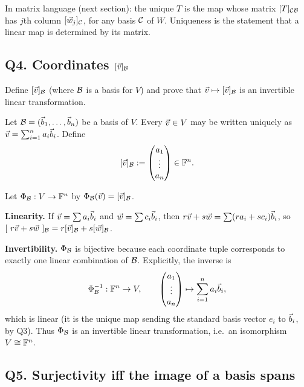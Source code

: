 \begin{laterbox}
In matrix language (next section): the unique $T$ is the map whose matrix
$[T]_{\mathcal{C}\mathcal{B}}$ has $j$th column $[\vec{w}_j]_{\mathcal{C}}$, for any basis $\mathcal{C}$ of $W$.
Uniqueness is the statement that a linear map is determined by its matrix.
\end{laterbox}

\subsection{Q4. Coordinates $[\vec{v}]_{\mathcal{B}}$}

\begin{promptbox}
Define $[\vec{v}]_{\mathcal{B}}$ (where $\mathcal{B}$ is a basis for $V$) and prove that
$\vec{v}\mapsto[\vec{v}]_{\mathcal{B}}$ is an invertible linear transformation.
\end{promptbox}

\begin{coursebox}
Let $\mathcal{B}=(\vec{b}_1,\ldots,\vec{b}_n)$ be a basis of $V$. Every $\vec{v}\in V$ may be written
uniquely as $\vec{v}=\sum_{i=1}^n a_i\vec{b}_i$. Define
\[
[\vec{v}]_{\mathcal{B}}:=\begin{pmatrix}a_1\\\vdots\\a_n\end{pmatrix}\in\mathbb{F}^n.
\]

Let $\Phi_{\mathcal{B}}:V\to\mathbb{F}^n$ by $\Phi_{\mathcal{B}}(\vec{v})=[\vec{v}]_{\mathcal{B}}$.

\textbf{Linearity.}
If $\vec{v}=\sum a_i\vec{b}_i$ and $\vec{w}=\sum c_i\vec{b}_i$, then
$r\vec{v}+s\vec{w}=\sum(ra_i+sc_i)\vec{b}_i$, so
$[\ r\vv+s\ww\ ]_{\cB}=r[\vv]_{\cB}+s[\ww]_{\cB}$.

\textbf{Invertibility.}
$\Phi_{\mathcal{B}}$ is bijective because each coordinate tuple corresponds to exactly
one linear combination of $\mathcal{B}$. Explicitly, the inverse is
\[
\Phi_{\mathcal{B}}^{-1}:\mathbb{F}^n\to V,\qquad
\begin{pmatrix}a_1\\\vdots\\a_n\end{pmatrix}\mapsto\sum_{i=1}^n a_i\vec{b}_i,
\]
which is linear (it is the unique map sending the standard basis vector $e_i$
to $\vec{b}_i$, by Q3). Thus $\Phi_{\mathcal{B}}$ is an invertible linear transformation,
i.e.\ an isomorphism $V\cong\mathbb{F}^n$.
\end{coursebox}

\subsection{Q5. Surjectivity iff the image of a basis spans}

